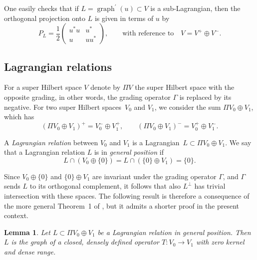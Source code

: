 \documentclass[10pt,a4paper]{amsart}
\numberwithin{equation}{section}
\newtheorem{Lemma}[Theorem]{Lemma}
\DeclareMathOperator{\graph}{\mathrm{graph}}
\begin{document}
\begin{Remark}
One easily checks that if $L = \graph^\prime(u) \subset V$ is a sub-Lagrangian, then the orthogonal projection onto $L$ is given in terms of $u$ by
\begin{equation} \label{FormulaForProjection}
 P_L = \frac{1}{2} \begin{pmatrix} u^*u & u^* \\ u & uu^* \end{pmatrix}, \qquad \text{with reference to} \quad V = V^+ \oplus V^-.
\end{equation}
\end{Remark}

\subsection{Lagrangian relations}

For a super Hilbert space $V$ denote by $\Pi V$ the super Hilbert space with the opposite grading, in other words, the grading operator $\Gamma$ is replaced by its negative.
For two super Hilbert spaces~$V_0$ and $V_1$, we consider the sum $\Pi V_0 \oplus V_1$, which has
\begin{equation*}
(\Pi V_0 \oplus V_1)^+ = V_0^- \oplus V_1^+, \qquad (\Pi V_0 \oplus V_1)^- = V_0^+ \oplus V_1^-.
\end{equation*}

\begin{Definition}
A \emph{Lagrangian relation} between $V_0$ and $V_1$ is a Lagrangian~${L \subset \Pi V_0 \oplus V_1}$.
We say that a Lagrangian relation $L$ is in \emph{general position} if
\begin{equation*}
L \cap (V_0 \oplus \{0\}) = L \cap (\{0\} \oplus V_1) = \{0\}.
\end{equation*}
\end{Definition}

\begin{Remark}
Since $V_0 \oplus \{0\}$ and $\{0\} \oplus V_1$ are invariant under the grading operator $\Gamma$, and $\Gamma$ sends $L$ to its orthogonal complement, it follows that also $L^\perp$ has trivial intersection with these spaces.
The following result is therefore a consequence of the more general Theorem~1 of \cite{HalmosTwoSubspaces}, but it admits a shorter proof in the present context.
\end{Remark}

\begin{Lemma} \label{LemmaGraph1}
Let $L \subset \Pi V_0 \oplus V_1$ be a Lagrangian relation in general position.
Then $L$ is the graph of a closed, densely defined operator $T\colon V_0 \rightarrow V_1$ with zero kernel and dense range.
\end{Lemma}
\end{document}
